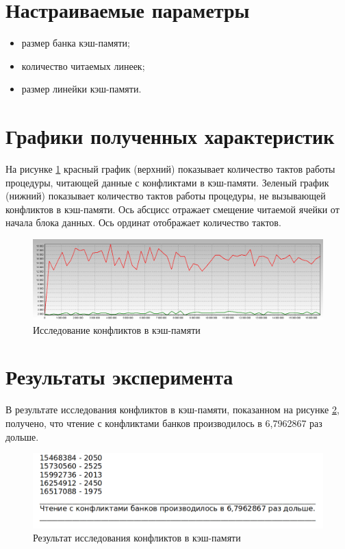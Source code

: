 \section{Настраиваемые параметры}

\begin{itemize}
	\item размер банка кэш-памяти;
	\item количество читаемых линеек;
	\item размер линейки кэш-памяти.
\end{itemize}

\section{Графики полученных характеристик}

На рисунке \ref{img:conflict} красный график (верхний) показывает количество тактов работы процедуры, читающей данные с конфликтами в кэш-памяти. Зеленый график (нижний) показывает количество тактов работы процедуры, не вызывающей конфликтов в кэш-памяти. Ось абсцисс отражает смещение читаемой ячейки от начала блока данных. Ось ординат отображает количество тактов.

\begin{figure}[H]
	\begin{center}
		\includegraphics[scale=0.3]{img/conflict.jpg}
	\end{center}
	\captionsetup{justification=centering}
	\caption{Исследование конфликтов в кэш-памяти}
	\label{img:conflict}
\end{figure}

\section{Результаты эксперимента}

В результате исследования конфликтов в кэш-памяти, показанном на рисунке \ref{img:conflict_result}, получено, что чтение с конфликтами банков производилось в 6,7962867 раз дольше.

\begin{figure}[H]
	\begin{center}
		\includegraphics[scale=0.4]{img/conflict_result.png}
	\end{center}
	\captionsetup{justification=centering}
	\caption{Результат исследования конфликтов в кэш-памяти}
	\label{img:conflict_result}
\end{figure}


